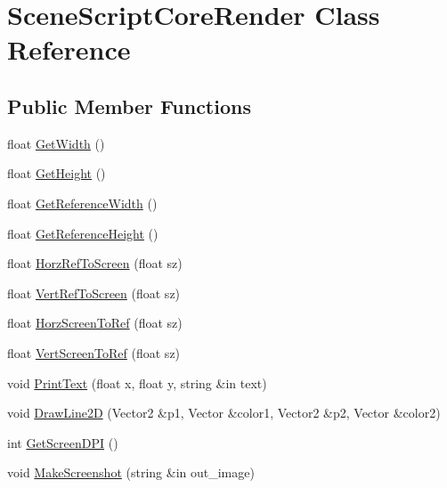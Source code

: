 \hypertarget{class_scene_script_core_render}{}\section{Scene\+Script\+Core\+Render Class Reference}
\label{class_scene_script_core_render}
\subsection*{Public Member Functions}
\begin{DoxyCompactItemize}
\item 
float \hyperlink{class_scene_script_core_render_a9ae50d6cc542a2a244de6d4988462f50}{Get\+Width} ()
\item 
float \hyperlink{class_scene_script_core_render_a5e51f6aa9b08fd6a596f63c4628cd6cb}{Get\+Height} ()
\item 
float \hyperlink{class_scene_script_core_render_a66038811c5d4b144ed88db6484ee2f19}{Get\+Reference\+Width} ()
\item 
float \hyperlink{class_scene_script_core_render_a32bda5ccbd1e51a85f8ad06b0ceb6cdf}{Get\+Reference\+Height} ()
\item 
float \hyperlink{class_scene_script_core_render_a32de8aefc151c085d917b90b8f0d08ba}{Horz\+Ref\+To\+Screen} (float sz)
\item 
float \hyperlink{class_scene_script_core_render_af227fea7325789cb2c9a9080e0595437}{Vert\+Ref\+To\+Screen} (float sz)
\item 
float \hyperlink{class_scene_script_core_render_aa727741ec6ea68ce6c1e0632e1c6330f}{Horz\+Screen\+To\+Ref} (float sz)
\item 
float \hyperlink{class_scene_script_core_render_aad036446033d2df24e6045fffa5cd2e0}{Vert\+Screen\+To\+Ref} (float sz)
\item 
void \hyperlink{class_scene_script_core_render_a28245df2984478f76f89ad6bfa3cddd0}{Print\+Text} (float x, float y, string \&in text)
\item 
void \hyperlink{class_scene_script_core_render_acadb3e717da0cdacf709a4d80c91c906}{Draw\+Line2D} (Vector2 \&p1, Vector \&color1, Vector2 \&p2, Vector \&color2)
\item 
int \hyperlink{class_scene_script_core_render_ab0e48e05342db528716a0c87f9758e76}{Get\+Screen\+D\+PI} ()
\item 
void \hyperlink{class_scene_script_core_render_a321acd93c9b84c0f53bfb725c9be9cfa}{Make\+Screenshot} (string \&in out\+\_\+image)
\end{DoxyCompactItemize}


